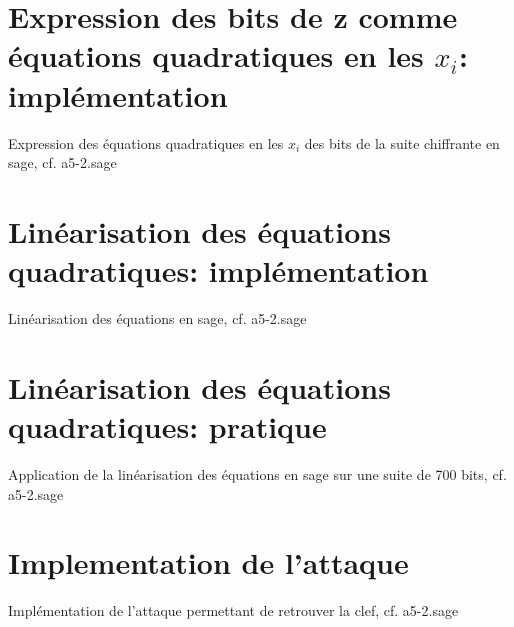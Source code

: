 \documentclass[a4paper]{article}
\begin{document}


\section{Expression des bits de z comme équations quadratiques en les $x_i$: implémentation}
Expression des équations quadratiques en les $x_i$ des bits de la suite chiffrante en sage, cf. a5-2.sage



\section{Linéarisation des équations quadratiques: implémentation}
Linéarisation des équations en sage, cf. a5-2.sage

\section{Linéarisation des équations quadratiques: pratique}
Application de la linéarisation des équations en sage sur une suite de 700 bits, cf. a5-2.sage









\section{Implementation de l'attaque}
Implémentation de l'attaque permettant de retrouver la clef, cf. a5-2.sage




\nocite{*}
\end{document}
